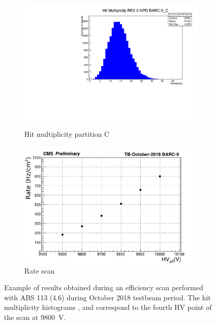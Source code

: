 \begin{figure}[H]
\begin{subfigure}{0.5\linewidth}
    		\includegraphics[width = \linewidth]{fig/chapt5/Hit_Multiplicity_RE2-2-NPD-BARC-9_C.pdf}
        	\caption{\label{fig:rate-scan:C} Hit multiplicity partition C}
    	\end{subfigure}
    	\begin{subfigure}{0.5\linewidth}
			\centering
    		\includegraphics[width = \linewidth]{fig/chapt5/Rate-Scan.pdf}
        	\caption{\label{fig:rate-scan:D} Rate scan}
    	\end{subfigure}
		\caption{\label{fig:rate-scan} Example of results obtained during an efficiency scan performed with ABS 113 (4.6) during October 2018 testbeam period. The hit multiplicity histograms ,  and  correspond to the fourth HV point of the scan at \SI{9800}{V}.}
	\end{figure}
		
